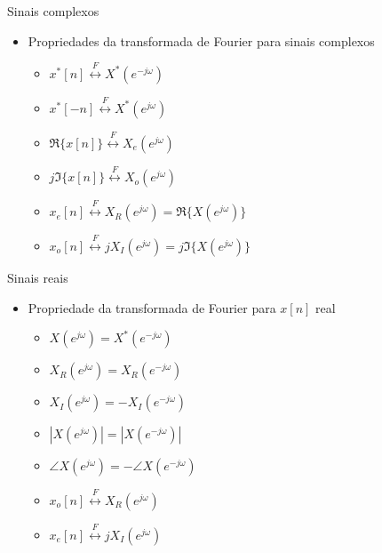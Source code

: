 \begin{slide}[toc=]{Sinais complexos}
\begin{itemize}
   \item Propriedades da transformada de Fourier para sinais complexos
\begin{itemize}
   \item $x^*[n]\stackrel{F}{\leftrightarrow} X^*(e^{-j\omega})$
   \item $x^*[-n]\stackrel{F}{\leftrightarrow} X^*(e^{j\omega})$
   \item $\Re\{x[n]\} \stackrel{F}{\leftrightarrow} X_e(e^{j\omega})$
   \item $j\Im\{x[n]\} \stackrel{F}{\leftrightarrow} X_o(e^{j\omega})$
   \item $x_e[n] \stackrel{F}{\leftrightarrow} X_R(e^{j\omega}) = \Re\{X(e^{j\omega})\}$
   \item $x_o[n] \stackrel{F}{\leftrightarrow} jX_I(e^{j\omega}) = j\Im\{X(e^{j\omega})\}$
\end{itemize}
\end{itemize}
\end{slide}


\begin{slide}[toc=]{Sinais reais}
\begin{itemize}
   \item Propriedade da transformada de Fourier para $x[n]$ real
   \begin{itemize}
      \item $ X(e^{j\omega}) = X^*(e^{-j\omega})$
      \item $ X_R(e^{j\omega}) = X_R(e^{-j\omega})$
      \item $ X_I(e^{j\omega}) = -X_I(e^{-j\omega})$
      \item $ |X(e^{j\omega})| = |X(e^{-j\omega})|$
      \item $ \angle X(e^{j\omega}) = -\angle X(e^{-j\omega})$
      \item $ x_o[n] \stackrel{F}{\leftrightarrow} X_R(e^{j\omega})$
      \item $ x_e[n] \stackrel{F}{\leftrightarrow} jX_I(e^{j\omega})$
   \end{itemize}
\end{itemize}
\end{slide}


